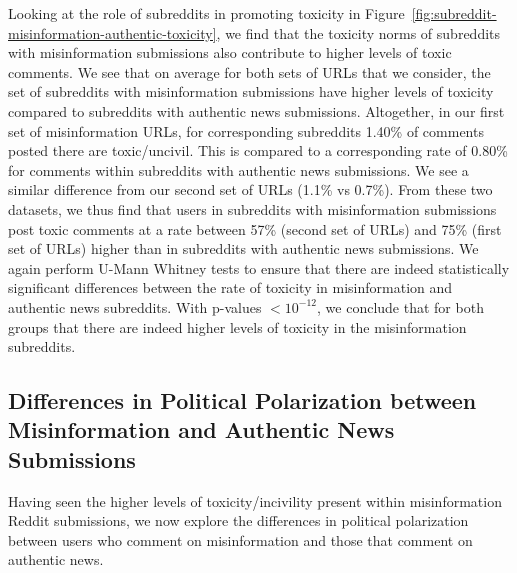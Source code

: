 Looking at the role of subreddits in promoting toxicity in Figure~\ref{fig:subreddit-misinformation-authentic-toxicity}, we find that the toxicity norms of subreddits with misinformation submissions also contribute to higher levels of toxic comments. We see that on average for both sets of URLs that we consider, the set of subreddits with misinformation submissions have higher levels of toxicity compared to subreddits with authentic news submissions. Altogether, in our first set of misinformation URLs, for corresponding subreddits 1.40\% of comments posted there are toxic/uncivil. This is compared to a corresponding rate of 0.80\% for comments within subreddits with authentic news submissions. We see a similar difference from our second set of URLs (1.1\% vs 0.7\%). From these two datasets, we thus find that users in subreddits with misinformation submissions post toxic comments at a rate between 57\% (second set of URLs) and 75\% (first set of URLs) higher than in subreddits with authentic news submissions. We again perform U-Mann Whitney tests to ensure that there are indeed statistically significant differences between the rate of toxicity in misinformation and authentic news subreddits. With p-values $<10^{-12}$, we conclude that for both groups that there are indeed higher levels of toxicity in the misinformation subreddits.

\subsection{Differences in Political Polarization between Misinformation and Authentic News Submissions}\label{sec:polarization}
Having seen the higher levels of toxicity/incivility present within misinformation Reddit submissions, we now explore the differences in political polarization between users who comment on misinformation and those that comment on authentic news.

